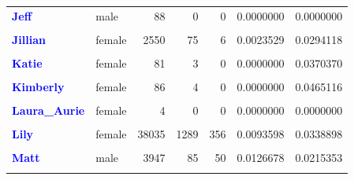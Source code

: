 \documentclass[
  man]{apa6}
\begin{document}
\begin{table}[!h]
\begin{tabular}[t]{>{}llrrrrr}
\textcolor{blue}{\textbf{Jeff}} & male & 88 & 0 & 0 & 0.0000000 & 0.0000000\\
\textcolor{blue}{\textbf{\cellcolor{gray!10}{Jessica}}} & \cellcolor{gray!10}{female} & \cellcolor{gray!10}{120} & \cellcolor{gray!10}{12} & \cellcolor{gray!10}{0} & \cellcolor{gray!10}{0.0000000} & \cellcolor{gray!10}{0.1000000}\\
\textcolor{blue}{\textbf{Jillian}} & female & 2550 & 75 & 6 & 0.0023529 & 0.0294118\\
\textcolor{blue}{\textbf{\cellcolor{gray!10}{Johnnie}}} & \cellcolor{gray!10}{male} & \cellcolor{gray!10}{222} & \cellcolor{gray!10}{22} & \cellcolor{gray!10}{10} & \cellcolor{gray!10}{0.0450450} & \cellcolor{gray!10}{0.0990991}\\
\addlinespace
\textcolor{blue}{\textbf{Katie}} & female & 81 & 3 & 0 & 0.0000000 & 0.0370370\\
\textcolor{blue}{\textbf{\cellcolor{gray!10}{Kevin}}} & \cellcolor{gray!10}{male} & \cellcolor{gray!10}{139} & \cellcolor{gray!10}{4} & \cellcolor{gray!10}{4} & \cellcolor{gray!10}{0.0287770} & \cellcolor{gray!10}{0.0287770}\\
\textcolor{blue}{\textbf{Kimberly}} & female & 86 & 4 & 0 & 0.0000000 & 0.0465116\\
\textcolor{blue}{\textbf{\cellcolor{gray!10}{Laura}}} & \cellcolor{gray!10}{female} & \cellcolor{gray!10}{1360} & \cellcolor{gray!10}{55} & \cellcolor{gray!10}{25} & \cellcolor{gray!10}{0.0183824} & \cellcolor{gray!10}{0.0404412}\\
\textcolor{blue}{\textbf{Laura\_Aurie}} & female & 4 & 0 & 0 & 0.0000000 & 0.0000000\\
\addlinespace
\textcolor{blue}{\textbf{\cellcolor{gray!10}{Laurel}}} & \cellcolor{gray!10}{female} & \cellcolor{gray!10}{276} & \cellcolor{gray!10}{18} & \cellcolor{gray!10}{1} & \cellcolor{gray!10}{0.0036232} & \cellcolor{gray!10}{0.0652174}\\
\textcolor{blue}{\textbf{Lily}} & female & 38035 & 1289 & 356 & 0.0093598 & 0.0338898\\
\textcolor{blue}{\textbf{\cellcolor{gray!10}{Martin}}} & \cellcolor{gray!10}{male} & \cellcolor{gray!10}{773} & \cellcolor{gray!10}{33} & \cellcolor{gray!10}{2} & \cellcolor{gray!10}{0.0025873} & \cellcolor{gray!10}{0.0426908}\\
\textcolor{blue}{\textbf{Matt}} & male & 3947 & 85 & 50 & 0.0126678 & 0.0215353\\
\textcolor{blue}{\textbf{\cellcolor{gray!10}{Matthew}}} & \cellcolor{gray!10}{male} & \cellcolor{gray!10}{49} & \cellcolor{gray!10}{0} & \cellcolor{gray!10}{0} & \cellcolor{gray!10}{0.0000000} & \cellcolor{gray!10}{0.0000000}\\

\end{tabular}
\end{table}
\end{document}
